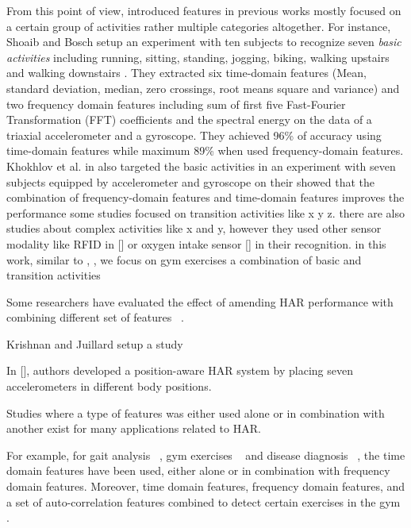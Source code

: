 \documentclass[journal,article,submit,moreauthors,pdftex]{Definitions/mdpi}
\begin{document}
From this point of view, introduced features in previous works mostly focused on a certain group of activities rather multiple categories altogether. For instance, Shoaib and Bosch setup an experiment with ten subjects to recognize seven \textit{basic activities} including running, sitting, standing, jogging, biking, walking upstairs and walking downstairs \cite{s140610146}. They extracted six time-domain features (Mean, standard deviation, median, zero crossings, root means square and variance) and two frequency domain features including sum of first five Fast-Fourier Transformation (FFT) coefficients and the spectral energy on the data of a triaxial accelerometer and a gyroscope. They achieved 96\% of accuracy using time-domain features while maximum 89\% when used frequency-domain features. Khokhlov et al. in \cite{khokhlov2018design} also targeted the basic activities in an experiment with seven subjects equipped by accelerometer and gyroscope on their showed that the combination of frequency-domain features and time-domain features improves the performance 
some studies focused on transition activities like x y z. there are also studies about complex activities like x and y, however they used other sensor modality like RFID in [] or oxygen intake sensor [] in their recognition. in this work, similar to \cite{morris2014recofit, }, , we focus on gym exercises a combination of basic and transition activities 





Some researchers have evaluated the effect of amending HAR performance with combining different set of features  ~\cite{yazdansepas2016multi, chen2018distilling}.


Krishnan and Juillard setup a study \cite{krishnan2009recognition}

In [], authors developed a position-aware HAR system by placing seven accelerometers in different body positions.




Studies where a type of features was either used alone or in combination with another exist for many applications related to HAR.

For example, for gait analysis ~\cite{zhang2011feature, sprager2015inertial}, gym exercises ~\cite{rosati2018comparison} and disease diagnosis ~\cite{janidarmian2014automated}, the time domain features have been used, either alone or in combination with frequency domain features. Moreover, time domain features, frequency domain features, and a set of auto-correlation features combined to detect certain exercises in the gym \cite{morris2014recofit, rosati2018comparison}. \\
\end{document}
